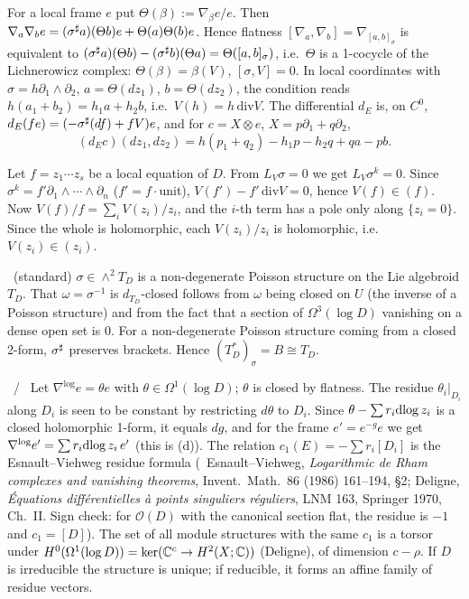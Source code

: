 \begin{lem}\tP\label{lem:flat}
For a local frame $e$ put $\Theta(\beta):=\nabla_\beta e/e$. Then $\nabla_a\nabla_be=(\sigma^\sharp a)(\Theta b)e+\Theta(a)\Theta(b)e$. Hence flatness $[\nabla_a,\nabla_b]=\nabla_{[a,b]_\sigma}$ is equivalent to
$(\sigma^\sharp a)(\Theta b)-(\sigma^\sharp b)(\Theta a)=\Theta([a,b]_\sigma)$, i.e.\ $\Theta$ is a 1-cocycle of the Lichnerowicz complex: $\Theta(\beta)=\beta(V)$, $[\sigma,V]=0$.
In local coordinates with $\sigma=h\partial_1\wedge\partial_2$, $a=\Theta(dz_1)$, $b=\Theta(dz_2)$, the condition reads $h(a_1+b_2)=h_1a+h_2b$, i.e.\ $V(h)=h\,\mathrm{div}V$. The differential $d_E$ is, on $C^0$, $d_E(fe)=(-\sigma^\sharp(df)+fV)e$, and for $c=X\otimes e$, $X=p\partial_1+q\partial_2$,
\[(d_Ec)(dz_1,dz_2)=h(p_1+q_2)-h_1p-h_2q+qa-pb.\]
\end{lem}
\begin{lem}[$V$ is logarithmic]\tP\label{lem:log}
Let $f=z_1\cdots z_s$ be a local equation of $D$. From $L_V\sigma=0$ we get $L_V\sigma^k=0$. Since $\sigma^k=f'\partial_1\wedge\cdots\wedge\partial_n$ ($f'=f\cdot$unit), $V(f')-f'\,\mathrm{div}V=0$, hence $V(f)\in(f)$. Now $V(f)/f=\sum_iV(z_i)/z_i$, and the $i$-th term has a pole only along $\{z_i=0\}$. Since the whole is holomorphic, each $V(z_i)/z_i$ is holomorphic, i.e.\ $V(z_i)\in(z_i)$.
\end{lem}
\begin{lem}\tP\ (standard)\label{lem:iso}
$\sigma\in\wedge^2T_D$ is a non-degenerate Poisson structure on the Lie algebroid $T_D$. That $\omega=\sigma^{-1}$ is $d_{T_D}$-closed follows from $\omega$ being closed on $U$ (the inverse of a Poisson structure) and from the fact that a section of $\Omega^3(\log D)$ vanishing on a dense open set is $0$. For a non-degenerate Poisson structure coming from a closed 2-form, $\sigma^\sharp$ preserves brackets. Hence $(T_D^*)_\sigma=B\cong T_D$.
\end{lem}
\begin{lem}\tP\ /\ \tC\label{lem:res}
Let $\nabla^{\log}e=\theta e$ with $\theta\in\Omega^1(\log D)$; $\theta$ is closed by flatness. The residue $\theta_i|_{D_i}$ along $D_i$ is seen to be constant by restricting $d\theta$ to $D_i$. Since $\theta-\sum r_i\mathrm{dlog}\, z_i$ is a closed holomorphic 1-form, it equals $dg$, and for the frame $e'=e^{-g}e$ we get $\nabla^{\log}e'=\sum r_i\mathrm{dlog}\, z_i\,e'$ (this is (d)). The relation $c_1(E)=-\sum r_i[D_i]$ is the Esnault--Viehweg residue formula (\tC\ Esnault--Viehweg, \emph{Logarithmic de Rham complexes and vanishing theorems}, Invent.\ Math.\ 86 (1986) 161--194, \S2; Deligne, \emph{\'Equations diff\'erentielles \`a points singuliers r\'eguliers}, LNM 163, Springer 1970, Ch.~II. Sign check: for $\mathcal O(D)$ with the canonical section flat, the residue is $-1$ and $c_1=[D]$).
The set of all module structures with the same $c_1$ is a torsor under $H^0(\Omega^1(\log D))=\ker(\mathbb C^c\to H^2(X;\mathbb C))$ (Deligne), of dimension $c-\rho$. If $D$ is irreducible the structure is unique; if reducible, it forms an affine family of residue vectors.
\end{lem}
